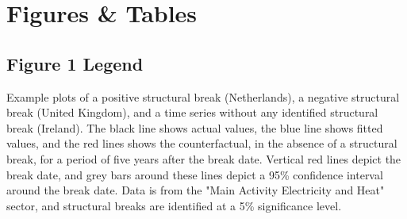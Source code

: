 \documentclass[a4paper]{article}
\begin{document}

\newpage

\section*{Figures \& Tables}

\FloatBarrier

\subsection{Figure 1 Legend}
Example plots of a positive structural break (Netherlands), a negative structural break (United Kingdom), and a time series without any identified structural break (Ireland). The black line shows actual values, the blue line shows fitted values, and the red lines shows the counterfactual, in the absence of a structural break, for a period of five years after the break date. Vertical red lines depict the break date, and grey bars around these lines depict a 95\% confidence interval around the break date. Data is from the "Main Activity Electricity and Heat" sector, and structural breaks are identified at a 5\% significance level.

\end{document}
